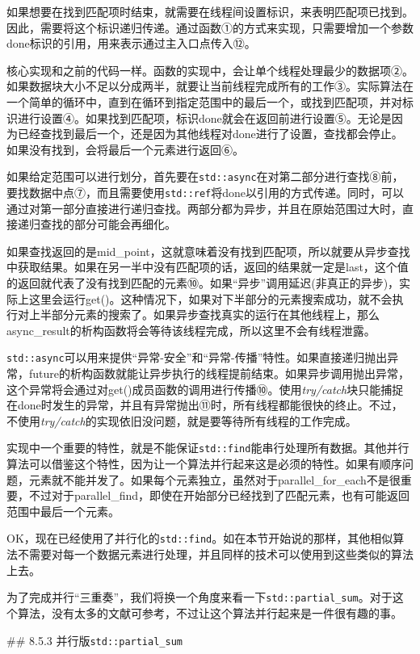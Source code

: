 如果想要在找到匹配项时结束，就需要在线程间设置标识，来表明匹配项已找到。因此，需要将这个标识递归传递。通过函数①的方式来实现，只需要增加一个参数done标识的引用，用来表示通过主入口点传入⑫。

核心实现和之前的代码一样。函数的实现中，会让单个线程处理最少的数据项②。如果数据块大小不足以分成两半，就要让当前线程完成所有的工作③。实际算法在一个简单的循环中，直到在循环到指定范围中的最后一个，或找到匹配项，并对标识进行设置④。如果找到匹配项，标识done就会在返回前进行设置⑤。无论是因为已经查找到最后一个，还是因为其他线程对done进行了设置，查找都会停止。如果没有找到，会将最后一个元素进行返回⑥。

如果给定范围可以进行划分，首先要在\texttt{std::async}在对第二部分进行查找⑧前，要找数据中点⑦，而且需要使用\texttt{std::ref}将done以引用的方式传递。同时，可以通过对第一部分直接进行递归查找。两部分都为异步，并且在原始范围过大时，直接递归查找的部分可能会再细化。

如果查找返回的是mid\_point，这就意味着没有找到匹配项，所以就要从异步查找中获取结果。如果在另一半中没有匹配项的话，返回的结果就一定是last，这个值的返回就代表了没有找到匹配的元素⑩。如果“异步”调用延迟(非真正的异步)，实际上这里会运行get()。这种情况下，如果对下半部分的元素搜索成功，就不会执行对上半部分元素的搜索了。如果异步查找真实的运行在其他线程上，那么async\_result的析构函数将会等待该线程完成，所以这里不会有线程泄露。

\texttt{std::async}可以用来提供“异常-安全”和“异常-传播”特性。如果直接递归抛出异常，future的析构函数就能让异步执行的线程提前结束。如果异步调用抛出异常，这个异常将会通过对get()成员函数的调用进行传播⑩。使用\textit{try/catch}块只能捕捉在done时发生的异常，并且有异常抛出⑪时，所有线程都能很快的终止。不过，不使用\textit{try/catch}的实现依旧没问题，就是要等待所有线程的工作完成。

实现中一个重要的特性，就是不能保证\texttt{std::find}能串行处理所有数据。其他并行算法可以借鉴这个特性，因为让一个算法并行起来这是必须的特性。如果有顺序问题，元素就不能并发了。如果每个元素独立，虽然对于parallel\_for\_each不是很重要，不过对于parallel\_find，即使在开始部分已经找到了匹配元素，也有可能返回范围中最后一个元素。

OK，现在已经使用了并行化的\texttt{std::find}。如在本节开始说的那样，其他相似算法不需要对每一个数据元素进行处理，并且同样的技术可以使用到这些类似的算法上去。

为了完成并行“三重奏”，我们将换一个角度来看一下\texttt{std::partial\_sum}。对于这个算法，没有太多的文献可参考，不过让这个算法并行起来是一件很有趣的事。

## 8.5.3 并行版\texttt{std::partial\_sum}

